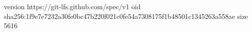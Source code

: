 version https://git-lfs.github.com/spec/v1
oid sha256:1f9e7e7232a30fe0bc47b220f021c0fe54a7308175f1b48501c1345263a558ae
size 5616
